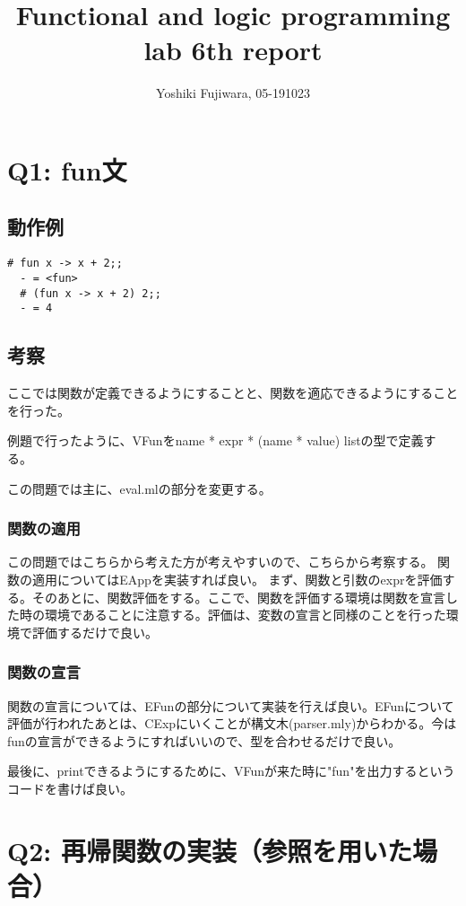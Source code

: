\documentclass[uplatex,12pt]{jsarticle}
\title {Functional and logic programming lab 6th report}
\date{}
\begin{document}
\author{Yoshiki Fujiwara, 05-191023}
\maketitle
\section{Q1: fun文}
\subsection{動作例}
\begin{lstlisting}[caption=動作例]
  # fun x -> x + 2;;
  - = <fun>
  # (fun x -> x + 2) 2;;
  - = 4
\end{lstlisting}

\subsection{考察}
ここでは関数が定義できるようにすることと、関数を適応できるようにすることを行った。

例題で行ったように、VFunをname * expr * (name * value) listの型で定義する。

この問題では主に、eval.mlの部分を変更する。

\subsubsection{関数の適用}
この問題ではこちらから考えた方が考えやすいので、こちらから考察する。
関数の適用についてはEAppを実装すれば良い。
まず、関数と引数のexprを評価する。そのあとに、関数評価をする。ここで、関数を評価する環境は関数を宣言した時の環境であることに注意する。評価は、変数の宣言と同様のことを行った環境で評価するだけで良い。

\subsubsection{関数の宣言}
関数の宣言については、EFunの部分について実装を行えば良い。EFunについて評価が行われたあとは、CExpにいくことが構文木(parser.mly)からわかる。今はfunの宣言ができるようにすればいいので、型を合わせるだけで良い。

最後に、printできるようにするために、VFunが来た時に"\<fun\>"を出力するというコードを書けば良い。


\section{Q2: 再帰関数の実装（参照を用いた場合）}
\end{document}
